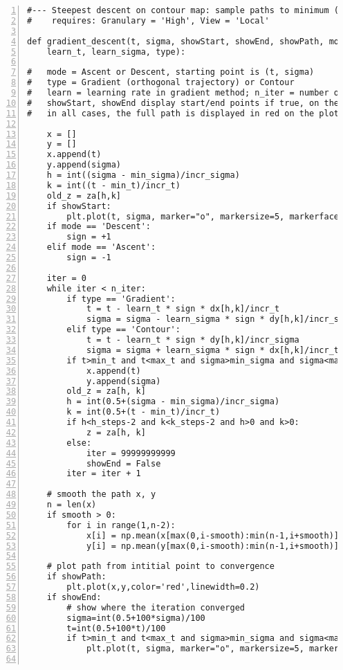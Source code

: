 \documentclass[oneside,10pt]{book}
\begin{document}
\begin{lstlisting}[numbers=left]
#--- Steepest descent on contour map: sample paths to minimum (a root of |Zeta|)
#    requires: Granulary = 'High', View = 'Local'

def gradient_descent(t, sigma, showStart, showEnd, showPath, mode, n_iter, \
    learn_t, learn_sigma, type):

#   mode = Ascent or Descent, starting point is (t, sigma)
#   type = Gradient (orthogonal trajectory) or Contour
#   learn = learning rate in gradient method; n_iter = number of iterations
#   showStart, showEnd display start/end points if true, on the plot
#   in all cases, the full path is displayed in red on the plot

    x = []
    y = []
    x.append(t)
    y.append(sigma)
    h = int((sigma - min_sigma)/incr_sigma)
    k = int((t - min_t)/incr_t)
    old_z = za[h,k]
    if showStart:
        plt.plot(t, sigma, marker="o", markersize=5, markerfacecolor="yellow",color="black")
    if mode == 'Descent': 
        sign = +1
    elif mode == 'Ascent':
        sign = -1
         
    iter = 0
    while iter < n_iter:
        if type == 'Gradient':
            t = t - learn_t * sign * dx[h,k]/incr_t    
            sigma = sigma - learn_sigma * sign * dy[h,k]/incr_sigma     
        elif type == 'Contour':
            t = t - learn_t * sign * dy[h,k]/incr_sigma  
            sigma = sigma + learn_sigma * sign * dx[h,k]/incr_t 
        if t>min_t and t<max_t and sigma>min_sigma and sigma<max_sigma:   
            x.append(t)
            y.append(sigma)
        old_z = za[h, k]
        h = int(0.5+(sigma - min_sigma)/incr_sigma)
        k = int(0.5+(t - min_t)/incr_t)             
        if h<h_steps-2 and k<k_steps-2 and h>0 and k>0: 
            z = za[h, k]
        else:
            iter = 99999999999
            showEnd = False
        iter = iter + 1

    # smooth the path x, y
    n = len(x)
    if smooth > 0:
        for i in range(1,n-2):
            x[i] = np.mean(x[max(0,i-smooth):min(n-1,i+smooth)])
            y[i] = np.mean(y[max(0,i-smooth):min(n-1,i+smooth)])

    # plot path from intitial point to convergence
    if showPath:
        plt.plot(x,y,color='red',linewidth=0.2)
    if showEnd:   
        # show where the iteration converged
        sigma=int(0.5+100*sigma)/100
        t=int(0.5+100*t)/100
        if t>min_t and t<max_t and sigma>min_sigma and sigma<max_sigma:
            plt.plot(t, sigma, marker="o", markersize=5, markerfacecolor="palegreen",color="black")


\end{lstlisting}
\end{document}
